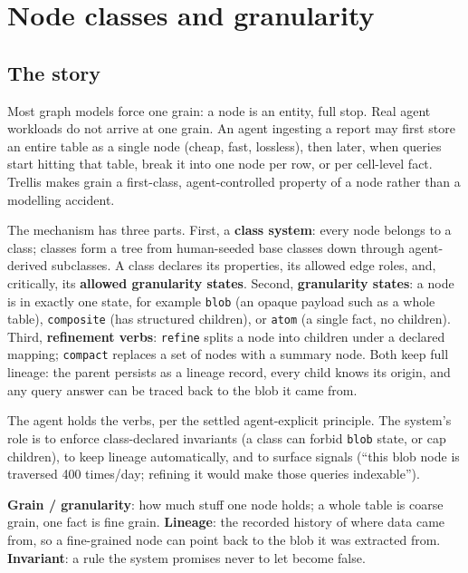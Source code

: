 \documentclass[11pt]{article}
\begin{document}
\section{Node classes and granularity}

\subsection{The story}

Most graph models force one grain: a node is an entity, full stop. Real agent workloads do not arrive at one grain. An agent ingesting a report may first store an entire table as a single node (cheap, fast, lossless), then later, when queries start hitting that table, break it into one node per row, or per cell-level fact. Trellis makes grain a first-class, agent-controlled property of a node rather than a modelling accident.

The mechanism has three parts. First, a \textbf{class system}: every node belongs to a class; classes form a tree from human-seeded base classes down through agent-derived subclasses. A class declares its properties, its allowed edge roles, and, critically, its \textbf{allowed granularity states}. Second, \textbf{granularity states}: a node is in exactly one state, for example \texttt{blob} (an opaque payload such as a whole table), \texttt{composite} (has structured children), or \texttt{atom} (a single fact, no children). Third, \textbf{refinement verbs}: \texttt{refine} splits a node into children under a declared mapping; \texttt{compact} replaces a set of nodes with a summary node. Both keep full lineage: the parent persists as a lineage record, every child knows its origin, and any query answer can be traced back to the blob it came from.

The agent holds the verbs, per the settled agent-explicit principle. The system's role is to enforce class-declared invariants (a class can forbid \texttt{blob} state, or cap children), to keep lineage automatically, and to surface signals (``this blob node is traversed 400 times/day; refining it would make those queries indexable'').

\begin{glossbox}
\textbf{Grain / granularity}: how much stuff one node holds; a whole table is coarse grain, one fact is fine grain. \textbf{Lineage}: the recorded history of where data came from, so a fine-grained node can point back to the blob it was extracted from. \textbf{Invariant}: a rule the system promises never to let become false.
\end{glossbox}
\end{document}
